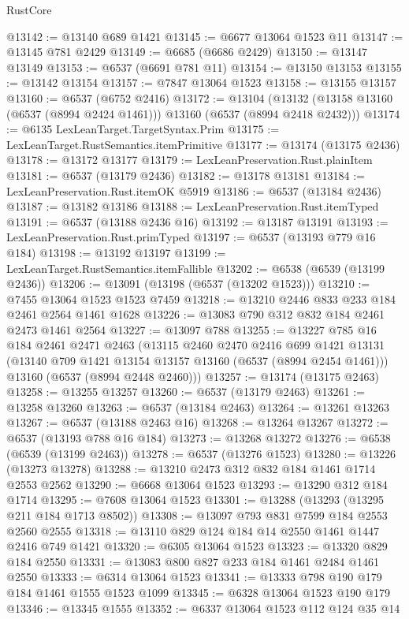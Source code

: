 \begin{lexlean}{RustCore}
\begin{coremodule}
@13142 := @13140 @689 @1421
@13145 := @6677 @13064 @1523 @11
@13147 := @13145 @781 @2429
@13149 := @6685 (@6686 @2429)
@13150 := @13147 @13149
@13153 := @6537 (@6691 @781 @11)
@13154 := @13150 @13153
@13155 := @13142 @13154
@13157 := @7847 @13064 @1523
@13158 := @13155 @13157
@13160 := @6537 (@6752 @2416)
@13172 := @13104
    (@13132 (@13158 @13160 (@6537 (@8994 @2424 @1461))) @13160 (@6537 (@8994 @2418 @2432)))
@13174 := @6135 LexLeanTarget.TargetSyntax.Prim
@13175 := LexLeanTarget.RustSemantics.itemPrimitive
@13177 := @13174 (@13175 @2436)
@13178 := @13172 @13177
@13179 := LexLeanPreservation.Rust.plainItem
@13181 := @6537 (@13179 @2436)
@13182 := @13178 @13181
@13184 := LexLeanPreservation.Rust.itemOK @5919
@13186 := @6537 (@13184 @2436)
@13187 := @13182 @13186
@13188 := LexLeanPreservation.Rust.itemTyped
@13191 := @6537 (@13188 @2436 @16)
@13192 := @13187 @13191
@13193 := LexLeanPreservation.Rust.primTyped
@13197 := @6537 (@13193 @779 @16 @184)
@13198 := @13192 @13197
@13199 := LexLeanTarget.RustSemantics.itemFallible
@13202 := @6538 (@6539 (@13199 @2436))
@13206 := @13091 (@13198 (@6537 (@13202 @1523)))
@13210 := @7455 @13064 @1523 @1523 @7459
@13218 := @13210 @2446 @833 @233 @184 @2461 @2564 @1461 @1628
@13226 := @13083 @790 @312 @832 @184 @2461 @2473 @1461 @2564
@13227 := @13097 @788
@13255 := @13227
    @785
    @16
    @184
    @2461
    @2471
    @2463
    (@13115
      @2460
      @2470
      @2416
      @699
      @1421
      @13131
      (@13140 @709 @1421 @13154 @13157 @13160 (@6537 (@8994 @2454 @1461)))
      @13160
      (@6537 (@8994 @2448 @2460)))
@13257 := @13174 (@13175 @2463)
@13258 := @13255 @13257
@13260 := @6537 (@13179 @2463)
@13261 := @13258 @13260
@13263 := @6537 (@13184 @2463)
@13264 := @13261 @13263
@13267 := @6537 (@13188 @2463 @16)
@13268 := @13264 @13267
@13272 := @6537 (@13193 @788 @16 @184)
@13273 := @13268 @13272
@13276 := @6538 (@6539 (@13199 @2463))
@13278 := @6537 (@13276 @1523)
@13280 := @13226 (@13273 @13278)
@13288 := @13210 @2473 @312 @832 @184 @1461 @1714 @2553 @2562
@13290 := @6668 @13064 @1523
@13293 := @13290 @312 @184 @1714
@13295 := @7608 @13064 @1523
@13301 := @13288 (@13293 (@13295 @211 @184 @1713 @8502))
@13308 := @13097 @793 @831 @7599 @184 @2553 @2560 @2555
@13318 := @13110 @829 @124 @184 @14 @2550 @1461 @1447 @2416 @749 @1421
@13320 := @6305 @13064 @1523
@13323 := @13320 @829 @184 @2550
@13331 := @13083 @800 @827 @233 @184 @1461 @2484 @1461 @2550
@13333 := @6314 @13064 @1523
@13341 := @13333 @798 @190 @179 @184 @1461 @1555 @1523 @1099
@13345 := @6328 @13064 @1523 @190 @179
@13346 := @13345 @1555
@13352 := @6337 @13064 @1523 @112 @124 @35 @14

\end{coremodule}
\end{lexlean}

